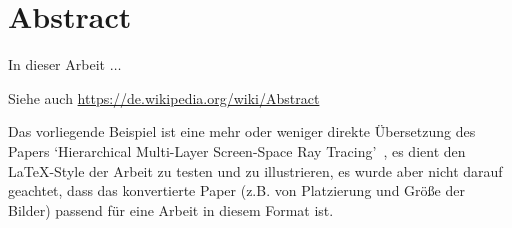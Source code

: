 \chapter*{Abstract}

\bigskip 


In dieser Arbeit $\ldots$

Siehe auch \url{https://de.wikipedia.org/wiki/Abstract}


\bigskip 

Das vorliegende Beispiel ist eine mehr oder weniger direkte Übersetzung des Papers `Hierarchical Multi-Layer Screen-Space Ray Tracing'~\cite{MaiThiNguyenKim.}, es dient den \LaTeX-Style der Arbeit zu testen und zu illustrieren, es wurde aber nicht darauf geachtet, dass das konvertierte Paper (z.B. von Platzierung und Größe der Bilder) passend für eine Arbeit in diesem Format ist.

